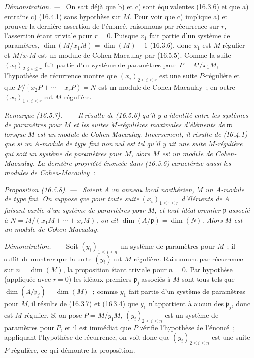 \documentclass[10pt,oneside]{book}
\makeatletter
\newcommand{\setmanualcurrentlabel}[1]{\def\@currentlabel{#1}}
\newcommand{\oldpage}[2][]{%
  \setcounter{footnote}{0}%
  \marginpar{\scriptsize\textbf{#1}~|~#2}\ignorespaces}
\newenvironment{proposition}[1][]{%
  \setmanualcurrentlabel{#1}\par\medskip\noindent\itshape Proposition (#1). ---\ }{\par}
\newenvironment{remark}[1][]{%
  \setmanualcurrentlabel{#1}\par\medskip\noindent\itshape Remarque (#1). ---\ }{\par}
\newenvironment{proof}{%
  \par\medskip\noindent\textit{Démonstration. ---\ }}{\par}
\makeatother
\begin{document}
\begin{proof}
On sait déjà que b) et c) sont équivalentes (16.3.6) et que a) entraîne c)
(16.4.1) sans hypothèse sur $M$. Pour voir que c) implique a) et prouver la
dernière assertion de l'énoncé, raisonnons par récurrence sur $r$, l'assertion
étant triviale pour $r=0$. Puisque $x_1$ fait partie d'un système de
paramètres, $\dim(M/x_1M)=\dim(M)-1$ (16.3.6), donc $x_1$ est $M$-régulier et
$M/x_1M$ est un module de Cohen-Macaulay par (16.5.5). Comme la suite
$(x_i)_{2\leq i\leq r}$ fait partie d'un système de paramètres pour
$P=M/x_1M$, l'hypothèse de récurrence montre que $(x_i)_{2\leq i\leq r}$ est
une suite $P$-régulière et que
$P/(x_2P+\cdots+x_rP)=N$ est un module de Cohen-Macaulay~; en outre
$(x_i)_{1\leq i\leq r}$ est $M$-régulière.
\end{proof}

\begin{remark}[16.5.7]
\label{0.16.5.7-fr}
Il résulte de (16.5.6) qu'il y a identité entre les \emph{systèmes de
paramètres pour $M$} et les \emph{suites $M$-régulières maximales d'éléments de
$\mathfrak{m}$} lorsque $M$ est un module de Cohen-Macaulay. Inversement, il
résulte de (16.4.1) que si un $A$-module de type fini non nul est tel qu'il y
ait une suite $M$-régulière qui soit un système de paramètres pour $M$, alors
$M$ est un module de Cohen-Macaulay. La dernière propriété énoncée dans
(16.5.6) \emph{caractérise aussi} les modules de Cohen-Macaulay~:
\end{remark}

\begin{proposition}[16.5.8]
\label{0.16.5.8-fr}
Soient $A$ un anneau local noethérien, $M$ un $A$-module de type fini. On
suppose que pour toute suite $(x_i)_{1\leq i\leq r}$ d'éléments de $A$
faisant partie d'un système de paramètres pour $M$, et tout idéal premier
$\mathfrak{p}$ associé à
$N=M/(x_1M+\cdots+x_rM)$, on ait
$\dim(A/\mathfrak{p})=\dim(N)$. Alors $M$ est un module de Cohen-Macaulay.
\end{proposition}

\begin{proof}
Soit $(y_i)_{1\leq i\leq n}$ un système de paramètres pour $M$~; il suffit de
montrer que la suite $(y_i)$ est $M$-régulière. Raisonnons par récurrence sur
$n=\dim(M)$, la proposition étant triviale pour $n=0$. Par hypothèse
(appliquée avec $r=0$) les idéaux premiers $\mathfrak{p}_j$ associés à $M$
sont tous tels que $\dim(A/\mathfrak{p}_j)=\dim(M)$~; comme $y_1$ fait partie
d'un système de paramètres
\oldpage[0\textsubscript{IV-1}]{38}
pour $M$, il résulte de (16.3.7) et (16.3.4) que $y_1$ n'appartient à aucun
des $\mathfrak{p}_j$, donc est $M$-régulier. Si on pose $P=M/y_1M$,
$(y_i)_{2\leq i\leq n}$ est un système de paramètres pour $P$, et il est
immédiat que $P$ vérifie l'hypothèse de l'énoncé~; appliquant l'hypothèse de
récurrence, on voit donc que $(y_i)_{2\leq i\leq n}$ est une suite
$P$-régulière, ce qui démontre la proposition.
\end{proof}
\end{document}
